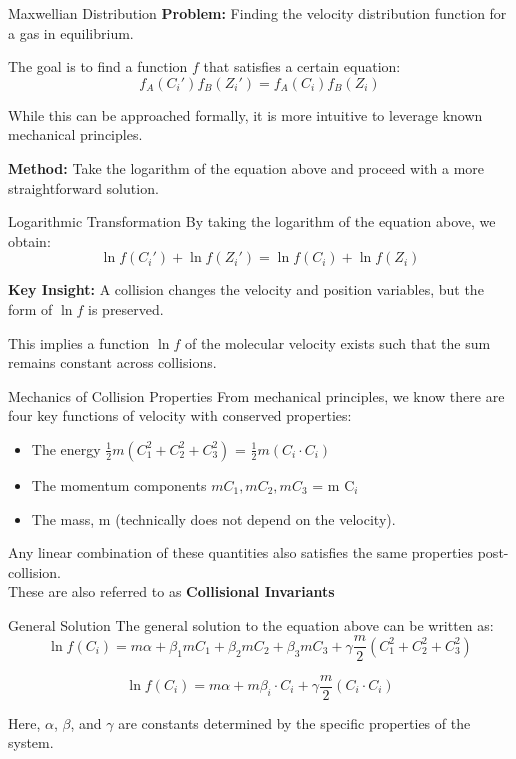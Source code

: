 \documentclass{beamer}
\begin{document}
\begin{frame}{Maxwellian Distribution}
    \textbf{Problem:} Finding the velocity distribution function for a gas in equilibrium.
    
    The goal is to find a function \( f \) that satisfies a certain equation: 
      \[
    f_A(C_i') f_B(Z_i') = f_A(C_i) f_B(Z_i)
    \]
    
    While this can be approached formally, it is more intuitive to leverage known mechanical principles.
    
    \textbf{Method:} Take the logarithm of the equation above and proceed with a more straightforward solution.
\end{frame}

\begin{frame}{Logarithmic Transformation}
    By taking the logarithm of the equation above, we obtain:
    \[
    \ln f(C_i') + \ln f(Z_i') = \ln f(C_i) + \ln f(Z_i)
    \]
    
    \textbf{Key Insight:} 
    A collision changes the velocity and position variables, but the form of \( \ln f \) is preserved.

    This implies a function \( \ln f \) of the molecular velocity exists such that the sum remains constant across collisions.
\end{frame}

\begin{frame}{Mechanics of Collision Properties}
    From mechanical principles, we know there are four key functions of velocity with conserved properties:
    
    \begin{itemize}
        \item The energy \( \frac{1}{2}m(C_1^2 + C_2^2 + C_3^2) \) = \( \frac{1}{2}m(C_i \cdot C_i ) \)
        \item The momentum components \( mC_1, mC_2, mC_3 \) = m C$_i$
        \item The mass, m (technically does not depend on the velocity).
    \end{itemize}
    
    Any linear combination of these quantities also satisfies the same properties post-collision.\\
    \vskip0.2cm
    These are also referred to as {\bf Collisional Invariants}
\end{frame}

\begin{frame}{General Solution}
    The general solution to the equation above can be written as:
    \[
    \ln f(C_i) = m \alpha + \beta_1 m C_1 +  \beta_2 m C_2 + \beta_3 m C_3 + \gamma \frac{m}{2}(C_1^2 + C_2^2 + C_3^2) 
    \]

      \[
    \ln f(C_i) = m \alpha + m \beta_i \cdot C_i + \gamma \frac{m}{2}(C_i \cdot C_i) 
    \]
    
    Here, $\alpha$, $\beta$, and $\gamma$ are constants determined by the specific properties of the system.
\end{frame}
\end{document}
